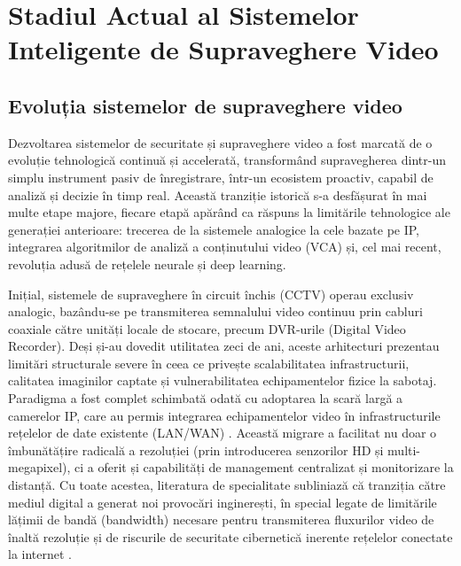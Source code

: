 \documentclass[../../main.tex]{subfiles}
\begin{document}
\chapter{Stadiul Actual al Sistemelor \\ Inteligente de Supraveghere Video}
\label{ch:stadiul_actual}

\section{Evoluția sistemelor de supraveghere video}
\label{sec:evolutie}

Dezvoltarea sistemelor de securitate și supraveghere video a fost marcată de o evoluție tehnologică continuă și accelerată, transformând supravegherea dintr-un simplu instrument pasiv de înregistrare, într-un ecosistem proactiv, capabil de analiză și decizie în timp real. Această tranziție istorică s-a desfășurat în mai multe etape majore, fiecare etapă apărând ca răspuns la limitările tehnologice ale generației anterioare: trecerea de la sistemele analogice la cele bazate pe IP, integrarea algoritmilor de analiză a conținutului video (VCA) și, cel mai recent, revoluția adusă de rețelele neurale și deep learning.

Inițial, sistemele de supraveghere în circuit închis (CCTV) operau exclusiv analogic, bazându-se pe transmiterea semnalului video continuu prin cabluri coaxiale către unități locale de stocare, precum DVR-urile (Digital Video Recorder). Deși și-au dovedit utilitatea zeci de ani, aceste arhitecturi prezentau limitări structurale severe în ceea ce privește scalabilitatea infrastructurii, calitatea imaginilor captate și vulnerabilitatea echipamentelor fizice la sabotaj. Paradigma a fost complet schimbată odată cu adoptarea la scară largă a camerelor IP, care au permis integrarea echipamentelor video în infrastructurile rețelelor de date existente (LAN/WAN) \cite{ip_surveillance}. Această migrare a facilitat nu doar o îmbunătățire radicală a rezoluției (prin introducerea senzorilor HD și multi-megapixel), ci a oferit și capabilități de management centralizat și monitorizare la distanță. Cu toate acestea, literatura de specialitate subliniază că tranziția către mediul digital a generat noi provocări inginerești, în special legate de limitările lățimii de bandă (bandwidth) necesare pentru transmiterea fluxurilor video de înaltă rezoluție și de riscurile de securitate cibernetică inerente rețelelor conectate la internet \cite{ip_surveillance}.
\end{document}
